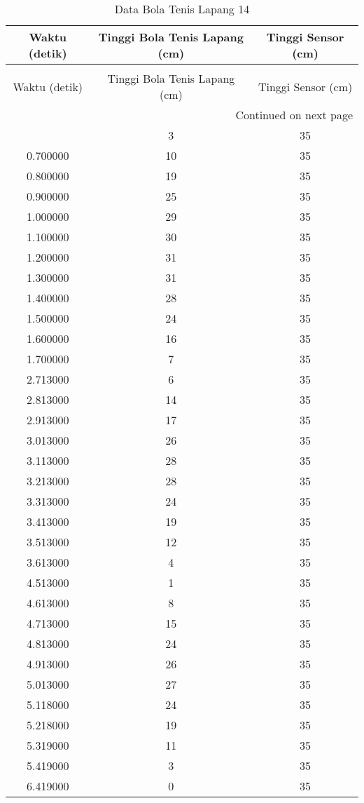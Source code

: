 \begin{longtable}[htbp]{|c|c|c|}
\caption{Data Bola Tenis Lapang 14} \\
\hline
Waktu (detik) & Tinggi Bola Tenis Lapang (cm) & Tinggi Sensor (cm) \\ \hline
\endfirsthead
\caption[]{Data Bola Tenis Lapang 14} \\
\hline
Waktu (detik) & Tinggi Bola Tenis Lapang (cm) & Tinggi Sensor (cm) \\ \hline
\endhead
\multicolumn{3}{r}{Continued on next page} \\
\endfoot
\endlastfoot
0.600000 & 3 & 35 \\ \hline
0.700000 & 10 & 35 \\ \hline
0.800000 & 19 & 35 \\ \hline
0.900000 & 25 & 35 \\ \hline
1.000000 & 29 & 35 \\ \hline
1.100000 & 30 & 35 \\ \hline
1.200000 & 31 & 35 \\ \hline
1.300000 & 31 & 35 \\ \hline
1.400000 & 28 & 35 \\ \hline
1.500000 & 24 & 35 \\ \hline
1.600000 & 16 & 35 \\ \hline
1.700000 & 7 & 35 \\ \hline
2.713000 & 6 & 35 \\ \hline
2.813000 & 14 & 35 \\ \hline
2.913000 & 17 & 35 \\ \hline
3.013000 & 26 & 35 \\ \hline
3.113000 & 28 & 35 \\ \hline
3.213000 & 28 & 35 \\ \hline
3.313000 & 24 & 35 \\ \hline
3.413000 & 19 & 35 \\ \hline
3.513000 & 12 & 35 \\ \hline
3.613000 & 4 & 35 \\ \hline
4.513000 & 1 & 35 \\ \hline
4.613000 & 8 & 35 \\ \hline
4.713000 & 15 & 35 \\ \hline
4.813000 & 24 & 35 \\ \hline
4.913000 & 26 & 35 \\ \hline
5.013000 & 27 & 35 \\ \hline
5.118000 & 24 & 35 \\ \hline
5.218000 & 19 & 35 \\ \hline
5.319000 & 11 & 35 \\ \hline
5.419000 & 3 & 35 \\ \hline
6.419000 & 0 & 35 \\ \hline
\end{longtable}
